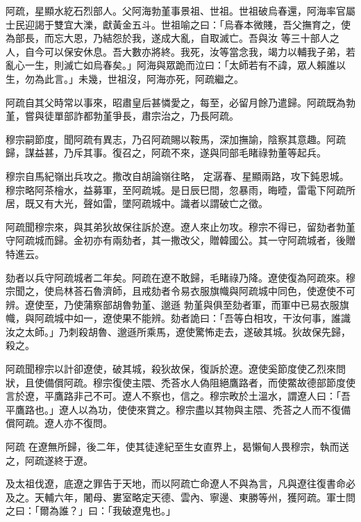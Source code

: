 \begin{pinyinscope}
 阿疏，星顯水紇石烈部人。父阿海勃堇事景祖、世祖。世祖破烏春還，阿海率官屬士民迎謁于雙宜大濼，獻黃金五斗。世祖喻之曰：「烏春本微賤，吾父撫育之，使為部長，而忘大恩，乃結怨於我，遂成大亂，自取滅亡。吾與汝
 等三十部人之人，自今可以保安休息。吾大數亦將終。我死，汝等當念我，竭力以輔我子弟，若亂心一生，則滅亡如烏春矣。」阿海與眾跪而泣曰：「太師若有不諱，眾人賴誰以生，勿為此言。」未幾，世祖沒，阿海亦死，阿疏繼之。



 阿疏自其父時常以事來，昭肅皇后甚憐愛之，每至，必留月餘乃遣歸。阿疏既為勃堇，嘗與徒單部詐都勃堇爭長，肅宗治之，乃長阿疏。



 穆宗嗣節度，聞阿疏有異志，乃召阿疏賜以鞍馬，深加撫諭，陰察其意趣。阿疏歸，謀益甚，乃斥其事。復召之，阿疏不來，遂與同部毛睹祿勃董等起兵。



 穆宗自馬紀嶺出兵攻之。撒改自胡論嶺往略，
 定潺春、星顯兩路，攻下鈍恩城。穆宗略阿茶檜水，益募軍，至阿疏城。是日辰巳間，忽暴雨，晦曀，雷電下阿疏所居，既又有大光，聲如雷，墜阿疏城中。識者以謂破亡之徵。



 阿疏聞穆宗來，與其弟狄故保往訴於遼。遼人來止勿攻。穆宗不得已，留劾者勃堇守阿疏城而歸。金初亦有兩劾者，其一撒改父，贈韓國公。其一守阿疏城者，後贈特進云。



 劾者以兵守阿疏城者二年矣。阿疏在遼不敢歸，毛睹祿乃降。遼使復為阿疏來。穆宗聞之，使烏林荅石魯濟師，且戒劾者令易衣服旗幟與阿疏城中同色，使遼使不可辨。遼使至，乃使蒲察部胡魯勃堇、邈遜
 勃堇與俱至劾者軍，而軍中已易衣服旗幟，與阿疏城中如一，遼使果不能辨。劾者詭曰：「吾等白相攻，干汝何事，誰識汝之太師。」乃刺殺胡魯、邈遜所乘馬，遼使驚怖走去，遂破其城。狄故保先歸，殺之。



 阿疏聞穆宗以計卻遼使，破其城，殺狄故保，復訴於遼。遼使奚節度使乙烈來問狀，且使備償阿疏。穆宗復使主隈、禿荅水人偽阻絕鷹路者，而使鱉故德部節度使言於遼，平鷹路非己不可。遼人不察也，信之。穆宗畋於土溫水，謂遼人曰：「吾平鷹路也。」遼人以為功，使使來賞之。穆宗盡以其物與主隈、禿荅之人而不復備償阿疏。遼人亦不復問。



 阿疏
 在遼無所歸，後二年，使其徒達紀至生女直界上，曷懶甸人畏穆宗，執而送之，阿疏遂終于遼。



 及太祖伐遼，底遼之罪告于天地，而以阿疏亡命遼人不與為言，凡與遼往復書命必及之。天輔六年，闍母、婁室略定天德、雲內、寧邊、東勝等州，獲阿疏。軍士問之曰：「爾為誰？」曰：「我破遼鬼也。」




\end{pinyinscope}
